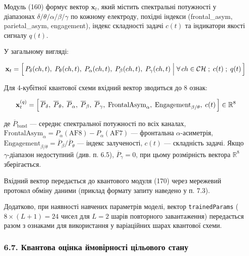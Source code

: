 \documentclass[12pt,a4paper]{article}
\begin{document}
Модуль (160) формує вектор \(\mathbf{x}_t\), який містить спектральні потужності у діапазонах \(\delta/\theta/\alpha/\beta/\gamma\) по кожному електроду, похідні індекси (frontal\_asym, parietal\_asym, engagement), індекс складності задачі \(c(t)\) та індикатори якості сигналу \(q(t)\).



У загальному вигляді:



\[\mathbf{x}_t = \Bigl[\,P_\delta(ch,t),\;P_\theta(ch,t),\;P_\alpha(ch,t),\;P_\beta(ch,t),\;P_\gamma(ch,t)\;\Big|\;\forall\,ch \in \mathcal{CH}\;;\;c(t)\;;\;q(t)\,\Bigr]\]



Для 4-кубітної квантової схеми вхідний вектор зводиться до 8 ознак:



\[\mathbf{x}_t^{(q)} = \Bigl[\,\overline{P}_\delta,\;\overline{P}_\theta,\;\overline{P}_\alpha,\;\overline{P}_\beta,\;\overline{P}_\gamma,\;\text{FrontalAsym}_\alpha,\;\text{Engagement}_{\beta/\theta},\;c(t)\,\Bigr] \in \mathbb{R}^8\]



де \(\overline{P}_{\text{band}}\) --- середнє спектральної потужності по всіх каналах, \(\text{FrontalAsym}_\alpha = P_\alpha(\text{AF8}) - P_\alpha(\text{AF7})\) --- фронтальна \(\alpha\)-асиметрія, \(\text{Engagement}_{\beta/\theta} = \overline{P}_\beta / \overline{P}_\theta\) --- індекс залученості, \(c(t)\) --- складність задачі. Якщо \(\gamma\)-діапазон недоступний (див. п. 6.5), \(\overline{P}_\gamma = 0\), при цьому розмірність вектора \(\mathbb{R}^8\) зберігається.



Вхідний вектор передається до квантового модуля (170) через мережевий протокол обміну даними (приклад формату запиту наведено у п. 7.3).



Додатково, при наявності навчених параметрів моделі, вектор \texttt{trainedParams} (\(8 \times (L + 1) = 24\) чисел для \(L = 2\) шарів повторного завантаження) передається разом з ознаками для використання у варіаційних шарах квантової схеми.



\subsubsection{6.7. Квантова оцінка ймовірності цільового стану}\label{ux43aux432ux430ux43dux442ux43eux432ux430-ux43eux446ux456ux43dux43aux430-ux439ux43cux43eux432ux456ux440ux43dux43eux441ux442ux456-ux446ux456ux43bux44cux43eux432ux43eux433ux43e-ux441ux442ux430ux43dux443}
\end{document}
